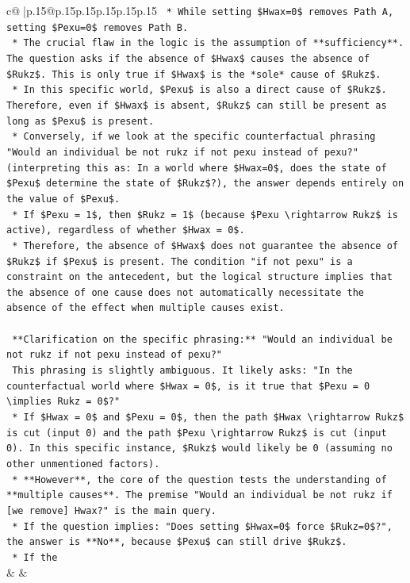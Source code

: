 \documentclass{article}
\begin{document}
{\begin{supertabular}{c@{$\;$}|p{.15\linewidth}@{}p{.15\linewidth}p{.15\linewidth}p{.15\linewidth}p{.15\linewidth}p{.15\linewidth}}
{{{\texttt{    *   While setting \$Hwax=0\$ removes Path A, setting \$Pexu=0\$ removes Path B.} \\
\texttt{    *   The crucial flaw in the logic is the assumption of **sufficiency**. The question asks if the absence of \$Hwax\$ causes the absence of \$Rukz\$. This is only true if \$Hwax\$ is the *sole* cause of \$Rukz\$.} \\
\texttt{    *   In this specific world, \$Pexu\$ is also a direct cause of \$Rukz\$. Therefore, even if \$Hwax\$ is absent, \$Rukz\$ can still be present as long as \$Pexu\$ is present.} \\
\texttt{    *   Conversely, if we look at the specific counterfactual phrasing "Would an individual be not rukz if not pexu instead of pexu?" (interpreting this as: In a world where \$Hwax=0\$, does the state of \$Pexu\$ determine the state of \$Rukz\$?), the answer depends entirely on the value of \$Pexu\$.} \\
\texttt{    *   If \$Pexu = 1\$, then \$Rukz = 1\$ (because \$Pexu \textbackslash{}rightarrow Rukz\$ is active), regardless of whether \$Hwax = 0\$.} \\
\texttt{    *   Therefore, the absence of \$Hwax\$ does not guarantee the absence of \$Rukz\$ if \$Pexu\$ is present. The condition "if not pexu" is a constraint on the antecedent, but the logical structure implies that the absence of one cause does not automatically necessitate the absence of the effect when multiple causes exist.} \\
\\ 
\texttt{    **Clarification on the specific phrasing:** "Would an individual be not rukz if not pexu instead of pexu?"} \\
\texttt{    This phrasing is slightly ambiguous. It likely asks: "In the counterfactual world where \$Hwax = 0\$, is it true that \$Pexu = 0 \textbackslash{}implies Rukz = 0\$?"} \\
\texttt{    *   If \$Hwax = 0\$ and \$Pexu = 0\$, then the path \$Hwax \textbackslash{}rightarrow Rukz\$ is cut (input 0) and the path \$Pexu \textbackslash{}rightarrow Rukz\$ is cut (input 0). In this specific instance, \$Rukz\$ would likely be 0 (assuming no other unmentioned factors).} \\
\texttt{    *   **However**, the core of the question tests the understanding of **multiple causes**. The premise "Would an individual be not rukz if {[}we remove{]} Hwax?" is the main query.} \\
\texttt{    *   If the question implies: "Does setting \$Hwax=0\$ force \$Rukz=0\$?", the answer is **No**, because \$Pexu\$ can still drive \$Rukz\$.} \\
\texttt{    *   If the} \\
            }
        }
    }
    & & \\ \\


\end{supertabular}}
\end{document}
